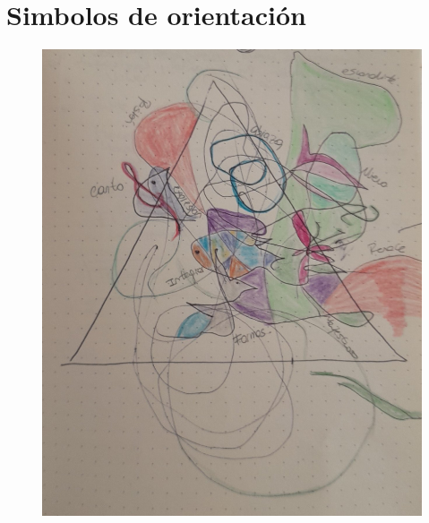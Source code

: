 \documentclass[12pt, a4paper, twoside]{book} %
\begin{document}
\chapter{Simbolos de orientación}

\begin{figure}[H]
	\centering
	\includegraphics[width=\textwidth]{./images/1f81324dd960fe.jpg}
\end{figure}
\end{document}
